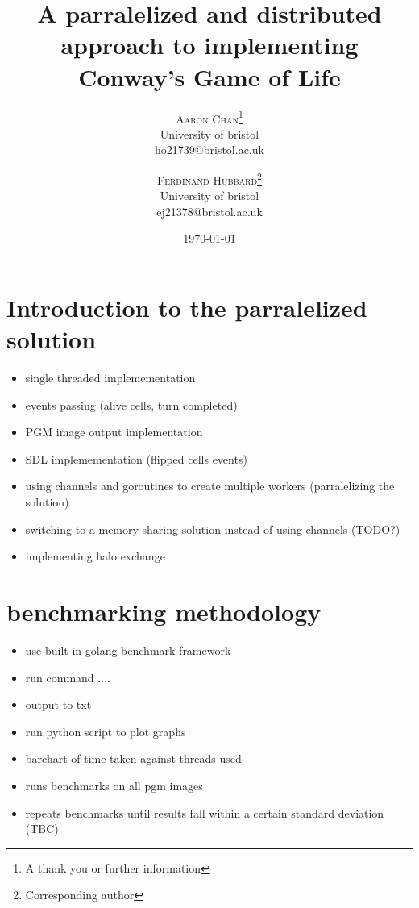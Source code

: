 \documentclass[twoside,twocolumn]{article}
\title{A parralelized and distributed approach to implementing Conway's Game of Life} %
\author{%
\textsc{Aaron Chan}\thanks{A thank you or further information} \\[1ex] %
\normalsize University of bristol \\ %
\normalsize {ho21739@bristol.ac.uk} %
\and %
\textsc{Ferdinand Hubbard}\thanks{Corresponding author} \\[1ex] %
\normalsize University of bristol \\ %
\normalsize {ej21378@bristol.ac.uk} %
}
\date{\today} %
\begin{document}
\maketitle

\section{Introduction to the parralelized solution}

\begin{itemize}
  \item single threaded implemementation
  \item events passing (alive cells, turn completed)
  \item PGM image output implementation
  \item SDL implemementation (flipped cells events)
  \item using channels and goroutines to create multiple workers (parralelizing the solution)
  \item switching to a memory sharing solution instead of using channels (TODO?)
  \item implementing halo exchange
\end{itemize}

\section{benchmarking methodology}

\begin{itemize}
  \item use built in golang benchmark framework
  \item run command ....
  \item output to txt
  \item run python script to plot graphs
  \item barchart of time taken against threads used
  \item runs benchmarks on all pgm images
  \item repeats benchmarks until results fall within a certain standard deviation (TBC)
\end{itemize}
\end{document}
